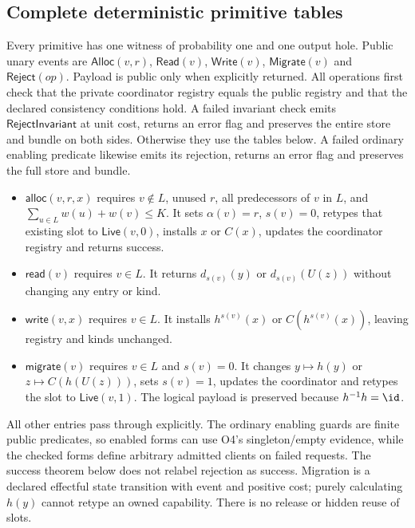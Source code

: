 \subsection{Complete deterministic primitive tables}
Every primitive has one witness of probability one and one output hole.
Public unary events are $\mathsf{Alloc}(v,r)$, $\mathsf{Read}(v)$,
$\mathsf{Write}(v)$, $\mathsf{Migrate}(v)$ and $\mathsf{Reject}(op)$.
Payload is public only when explicitly returned. All operations first check that the private coordinator registry equals
the public registry and that the declared consistency conditions hold.
A failed invariant check emits $\mathsf{RejectInvariant}$ at unit cost,
returns an error flag and preserves the entire store and bundle on both
sides. Otherwise they use the tables below. A failed ordinary enabling
predicate likewise emits its rejection, returns an error flag and preserves
the full store and bundle.
\begin{itemize}
\item $\mathsf{alloc}(v,r,x)$ requires $v\notin L$, unused $r$, all
  predecessors of $v$ in $L$, and
  $\sum_{u\in L}w(u)+w(v)\leq K$. It sets $\alpha(v)=r$, $s(v)=0$,
  retypes that existing slot to $\mathsf{Live}(v,0)$, installs $x$ or
  $C(x)$, updates the coordinator registry and returns success.
\item $\mathsf{read}(v)$ requires $v\in L$. It returns
  $d_{s(v)}(y)$ or $d_{s(v)}(U(z))$ without changing any entry or kind.
\item $\mathsf{write}(v,x)$ requires $v\in L$. It installs
  $h^{s(v)}(x)$ or $C(h^{s(v)}(x))$, leaving registry and kinds unchanged.
\item $\mathsf{migrate}(v)$ requires $v\in L$ and $s(v)=0$.
  It changes $y\mapsto h(y)$ or $z\mapsto C(h(U(z)))$, sets $s(v)=1$,
  updates the coordinator and retypes the slot to $\mathsf{Live}(v,1)$.
  The logical payload is preserved because $h^{-1}h=\id$.
\end{itemize}
All other entries pass through explicitly. The ordinary enabling guards are finite public
predicates, so enabled forms can use O4's singleton/empty evidence, while
the checked forms define arbitrary admitted clients on failed requests.
The success theorem below does not relabel rejection as success. Migration
is a declared effectful state transition with event and positive cost;
purely calculating $h(y)$ cannot retype an owned capability. There is no
release or hidden reuse of slots.

